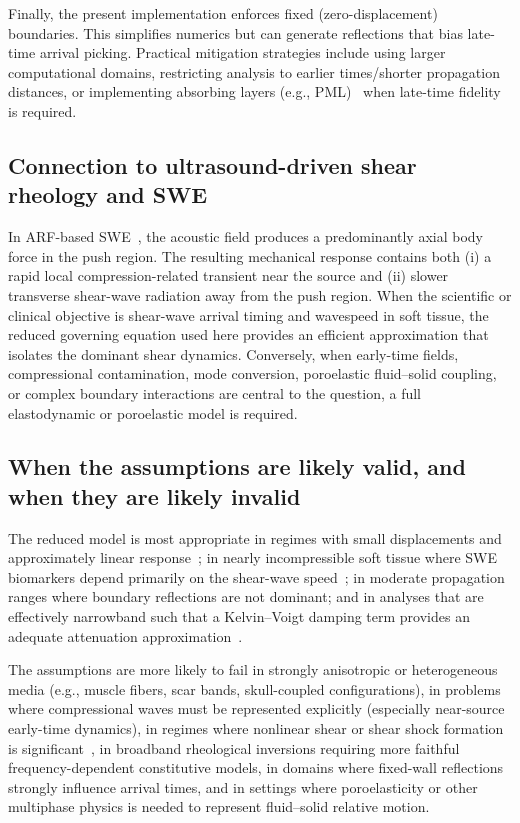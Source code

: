 \documentclass[11pt]{article}
\begin{document}
Finally, the present implementation enforces fixed (zero-displacement) boundaries.
This simplifies numerics but can generate reflections that bias late-time arrival
picking. Practical mitigation strategies include using larger computational domains,
restricting analysis to earlier times/shorter propagation distances, or implementing
absorbing layers (e.g., PML)~\cite{berenger1994perfect,collino2001application} when late-time fidelity is required.



\subsection{Connection to ultrasound-driven shear rheology and SWE}
In ARF-based SWE~\cite{nightingale2002radiation,bercoff2004supersonic}, the acoustic field produces a predominantly axial body force in the
push region. The resulting mechanical response contains both (i) a rapid local
compression-related transient near the source and (ii) slower transverse shear-wave
radiation away from the push region. When the scientific or clinical objective is
shear-wave arrival timing and wavespeed in soft tissue, the reduced governing
equation used here provides an efficient approximation that isolates the dominant
shear dynamics. Conversely, when early-time fields, compressional contamination,
mode conversion, poroelastic fluid--solid coupling, or complex boundary interactions
are central to the question, a full elastodynamic or poroelastic model is required.

\subsection{When the assumptions are likely valid, and when they are likely invalid}
The reduced model is most appropriate in regimes with small displacements and
approximately linear response~\cite{sarvazyan1998elasticity}; in nearly incompressible soft tissue where SWE
biomarkers depend primarily on the shear-wave speed~\cite{sandrin2003transient,tanter2008quantitative,barr2015elastography}; in moderate propagation ranges
where boundary reflections are not dominant; and in analyses that are effectively
narrowband such that a Kelvin--Voigt damping term provides an adequate attenuation
approximation~\cite{catheline2004viscoelastic}.

The assumptions are more likely to fail in strongly anisotropic or heterogeneous
media (e.g., muscle fibers, scar bands, skull-coupled configurations), in problems
where compressional waves must be represented explicitly (especially near-source
early-time dynamics), in regimes where nonlinear shear or shear shock formation
is significant~\cite{tripathi2017shearshock,espindola2017shearshock}, in broadband rheological inversions requiring more faithful
frequency-dependent constitutive models, in domains where fixed-wall reflections
strongly influence arrival times, and in settings where poroelasticity or other
multiphase physics is needed to represent fluid--solid relative motion.
\end{document}
